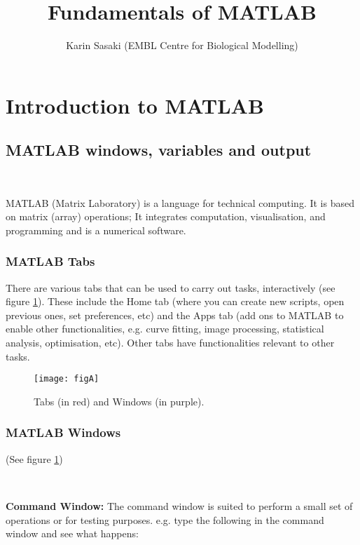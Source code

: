 \documentclass[11pt]{amsart}
\begin{document}
\title{Fundamentals of MATLAB}
\author{Karin Sasaki (EMBL Centre for Biological Modelling)}

\maketitle

\tableofcontents

\clearpage
\section{Introduction to MATLAB}

\subsection{MATLAB windows, variables and output}

\

MATLAB (Matrix Laboratory) is a language for technical computing. It is based on matrix (array) operations; It integrates computation, visualisation, and programming and is a numerical software.

\subsubsection{MATLAB Tabs}
There are various tabs that can be used to carry out tasks, interactively (see figure \ref{figA}). These include the Home tab (where you can create new scripts, open previous ones, set preferences, etc) and the Apps tab (add ons to MATLAB to enable other functionalities, e.g. curve fitting, image processing, statistical analysis, optimisation, etc). Other tabs have functionalities relevant to other tasks.

\begin{figure}[h]
\centering
\caption{Tabs (in red) and Windows (in purple).}
\label{figA}
	 \texttt{[image: figA]}
\end{figure}

\subsubsection{MATLAB Windows}
(See figure \ref{figA})

\

{\bf Command Window: }The command window is suited to perform a small set of operations or for testing purposes. 
e.g. type the following in the command window and see what happens:
\end{document}
